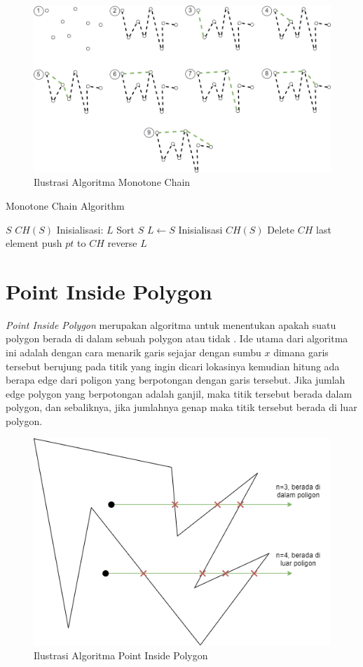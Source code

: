 \begin{figure}
	\Centering
	\includegraphics [width=\columnwidth]{bab2/img/ilustrasi-algoritma-monotone-chain}
	\caption {Ilustrasi Algoritma Monotone Chain}
	\label {fig:ilustrasi-algoritma-monotone-chain}
\end{figure}

\begin{algorithm}
	\caption{Monotone Chain Algorithm}
	\label{psdo:Monotone-Chain-Algorithm}
	\begin{algorithmic}[1]
		\Require $S$
		\Ensure $CH(S)$
        \State Inisialisasi: $L$
        \State Sort $S$
        \State $L \leftarrow S$
        \State Inisialisasi $CH(S)$
                    \State Delete $CH$ last element
                \EndWhile
                \State push $pt$ to $CH$
            \EndFor
            \State reverse $L$
        \EndFor
	\end{algorithmic}
\end{algorithm}
\section{Point Inside Polygon}
\label{sec:point-inside-polygon}
\textit{Point Inside Polygon} merupakan algoritma untuk menentukan apakah suatu polygon berada di dalam sebuah polygon atau tidak \cite{point_inside_polygon}. Ide utama dari algoritma ini adalah dengan cara menarik garis sejajar dengan sumbu $x$ dimana garis tersebut berujung pada titik yang ingin dicari lokasinya kemudian hitung ada berapa edge dari poligon yang berpotongan dengan garis tersebut. Jika jumlah edge polygon yang berpotongan adalah ganjil, maka titik tersebut berada dalam polygon, dan sebaliknya, jika jumlahnya genap maka titik tersebut berada di luar polygon.

\begin{figure}
	\Centering
	\includegraphics [width=0.5\columnwidth]{bab2/img/ilustrasi-algoritma-point-inside-polygon}
	\caption {Ilustrasi Algoritma Point Inside Polygon}
	\label {fig:ilustrasi-algoritma-point-inside-polygon}
\end{figure}